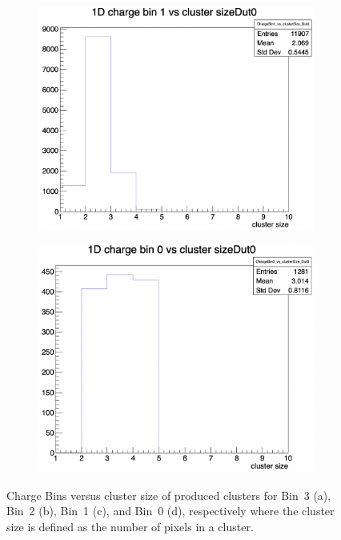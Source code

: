 \begin{figure}[H]
    \vspace{0.5cm}

    \begin{subfigure}[t]{0.45\textwidth}
        \centering
        \includegraphics[width=\textwidth]{images/ChargeBin1_us_clus_size.png}
        \caption{}
        \label{fig:dist_c}
    \end{subfigure}
    \hfill
    \begin{subfigure}[t]{0.45\textwidth}
        \centering
        \includegraphics[width=\textwidth]{images/ChargeBin0_us_clus_size.png}
        \caption{}
        \label{fig:dist_d}
    \end{subfigure}

    \caption{Charge Bins versus cluster size of produced clusters for Bin~3 (a), Bin~2 (b), Bin~1 (c), and Bin~0 (d), respectively where the cluster size is defined as the number of pixels in a cluster.}
    \label{fig:cluster_bins_vs_size}
\end{figure}

